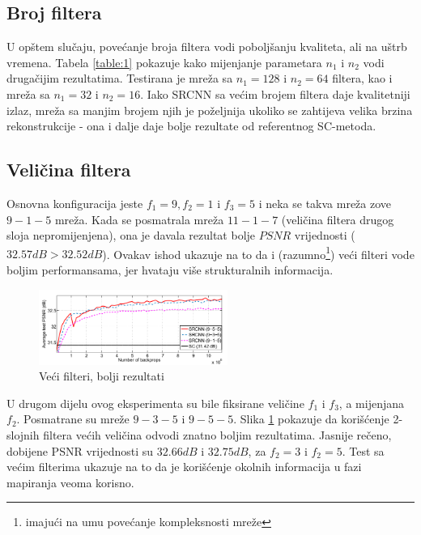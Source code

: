 \documentclass[12pt]{report}
\numberwithin{equation}{section}
\begin{document}
  \subsection{Broj filtera}
  
   U opštem slučaju, povećanje broja filtera vodi poboljšanju kvaliteta, ali na uštrb vremena. Tabela \ref{table:1}
pokazuje kako mijenjanje parametara $n_1$ i $n_2$ vodi drugačijim rezultatima. Testirana je mreža sa $n_1=128$ i $n_2=64$ filtera, kao i mreža sa $n_1=32$ i $n_2=16$. Iako SRCNN sa većim brojem filtera daje kvalitetniji izlaz, mreža sa manjim brojem njih je poželjnija ukoliko se zahtijeva velika brzina rekonstrukcije - ona i dalje daje bolje rezultate od referentnog SC-metoda.  
   
  \subsection{Veličina filtera}
   
  Osnovna konfiguracija jeste $f_1=9, f_2=1$ i $f_3=5$ i neka se takva  mreža zove $9-1-5$ mreža. Kada se posmatrala mreža $11-1-7$ (veličina filtera drugog sloja nepromijenjena), ona je davala rezultat bolje $PSNR$ vrijednosti ($32.57 \textit{dB} > 32.52 \textit{dB}$). Ovakav ishod ukazuje na to da i (razumno\footnote{imajući na umu povećanje kompleksnosti mreže}) veći filteri vode boljim performansama, jer hvataju više strukturalnih informacija. 

\begin{figure}
\vspace{-20pt}  
  \begin{center}
    \includegraphics[width=0.55\textwidth]{SLIKE/figure7}
  \end{center}
  \vspace{-20pt}
  \caption{Veći filteri, bolji rezultati}
  \vspace{-20pt}
  \label{fig:fsize}
\end{figure}  
  
  U drugom dijelu ovog eksperimenta su bile fiksirane veličine $f_1$ i $f_3$, a mijenjana $f_2$. Posmatrane su mreže $9-3-5$ i $9-5-5$. Slika \ref{fig:fsize} pokazuje da korišćenje 2-slojnih filtera većih veličina odvodi znatno boljim rezultatima. Jasnije rečeno, dobijene PSNR vrijednosti su $32.66dB$ i $32.75dB$, za $f_2=3$ i $f_2=5$. Test sa većim filterima ukazuje na to da je korišćenje okolnih informacija u fazi mapiranja veoma korisno. 
 
\end{document}

